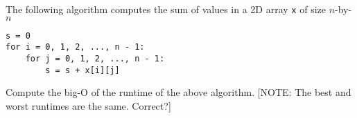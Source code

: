 The following algorithm
computes the sum of values in a 2D array \verb!x! of size 
$n$-by-$n$
\begin{Verbatim}[frame=single, fontsize=\small]
s = 0
for i = 0, 1, 2, ..., n - 1:
    for j = 0, 1, 2, ..., n - 1:
        s = s + x[i][j]
\end{Verbatim}
Compute the big-O of the runtime of the above algorithm.
[NOTE: The best and worst runtimes are the same. Correct?]
